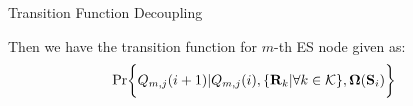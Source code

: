 \documentclass[10pt, conference, letterpaper]{IEEEtran}
\newcommand{\mat}{\mathbf}
\DeclarePairedDelimiter{\set}{\{}{\}}
\DeclarePairedDelimiter{\Brace}{\bigg\{}{\bigg\}}
\newcommand{\apSet}{\mathcal{K}}
\newcommand{\Stat}{\mathbf{S}}
\newcommand{\Policy}{\mathbf{\Omega}}
\begin{document}
\begin{section}{Transition Function Decoupling}
\begin{itemize}
        \end{itemize}
        Then we have the transition function for $m$-th ES node given as:
        \begin{align*}
            & \Pr\Brace{Q_{m,j}(i+1)|Q_{m,j}(i), \set{\mat{R}_{k}|\forall k\in\apSet}, \Policy(\Stat_i)}
        \end{align*}
    \end{section}
    
    
    
\end{document}
